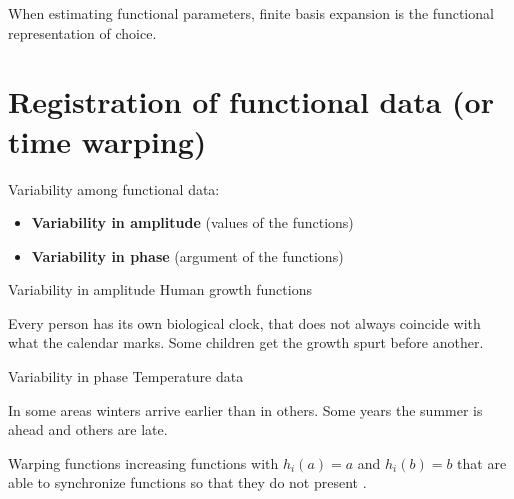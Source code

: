 \begin{note}
When estimating functional parameters, finite basis expansion is
the functional representation of choice.
\end{note}


\section[Registration of functional data]{Registration of functional data (or time warping)}

Variability among functional data:
\begin{itemize}
    \item \textbf{Variability in amplitude} (values of the functions)
    \item \textbf{Variability in phase} (argument of the functions)
\end{itemize}

\begin{example}{Variability in amplitude}{} Human growth functions

    Every person has its own biological clock, that does not always coincide 
    with what the calendar marks. Some children get the growth
    spurt before another.
\end{example}

\begin{example}{Variability in phase}{} Temperature data

    In some areas winters arrive earlier than in others. Some years the summer is ahead and
    others are late.
\end{example}

\begin{definition}{Warping functions}{}
    increasing functions with $h_i(a) = a$ and $h_i(b) = b$ that are
    able to synchronize functions so that they do not
    present .
\end{definition}

